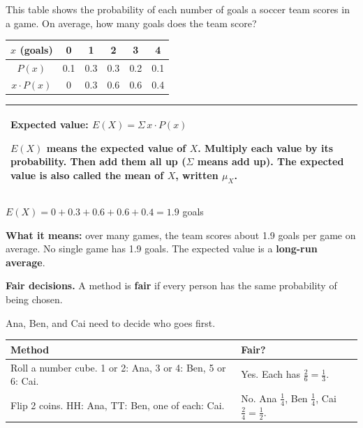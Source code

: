 \documentclass[11pt]{article}
\begin{document}

This table shows the probability of each number of goals a soccer team scores in a game. On average, how many goals does the team score?

\begin{center}
\renewcommand{\arraystretch}{1.4}
\begin{tabular}{|c|c|c|c|c|c|}\hline
$x$ (goals) & 0 & 1 & 2 & 3 & 4 \\ \hline
$P(x)$ & 0.1 & 0.3 & 0.3 & 0.2 & 0.1 \\ \hline
$x \cdot P(x)$ & 0 & 0.3 & 0.6 & 0.6 & 0.4 \\ \hline
\end{tabular}
\end{center}

\renewcommand{\arraystretch}{1.3}
\begin{tabular}{|>{\raggedright\arraybackslash}p{6.7in}|}\hline
\textbf{Expected value:} \qquad $E(X) = \Sigma\, x \cdot P(x)$\par\vspace{0.3em}
$E(X)$ means the expected value of $X$. Multiply each value by its probability. Then add them all up ($\Sigma$ means add up). The expected value is also called the \textbf{mean} of $X$, written $\mu_X$.\\ \hline
\end{tabular}

\vspace{0.4em}
$E(X) = 0 + 0.3 + 0.6 + 0.6 + 0.4 = \mathbf{1.9}$ goals

\vspace{0.4em}
\textbf{What it means:} over many games, the team scores about 1.9 goals per game on average.
No single game has 1.9 goals. The expected value is a \textbf{long-run average}.

\vspace{1em}
\textbf{Fair decisions.} A method is \textbf{fair} if every person has the same probability of being chosen.

\vspace{0.2em}
Ana, Ben, and Cai need to decide who goes first.

\vspace{0.3em}
\begin{tabular}{|>{\raggedright\arraybackslash}p{3.3in}|>{\raggedright\arraybackslash}p{3.2in}|}\hline
\textbf{Method} & \textbf{Fair?}\\ \hline
Roll a number cube. 1 or 2: Ana, 3 or 4: Ben, 5 or 6: Cai. & Yes. Each has $\frac{2}{6} = \frac{1}{3}$.\\[0.3em] \hline
Flip 2 coins. HH: Ana, TT: Ben, one of each: Cai. & No. Ana $\frac{1}{4}$, Ben $\frac{1}{4}$, Cai $\frac{2}{4} = \frac{1}{2}$.\\[0.3em] \hline
\end{tabular}
\end{document}
